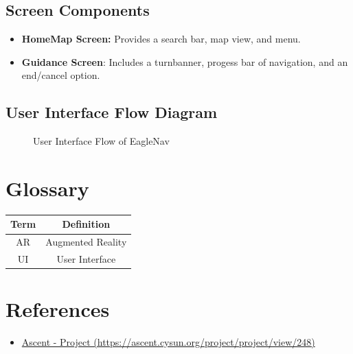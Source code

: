 \documentclass{article}
\begin{document}
\subsection{Screen Components}
\begin{itemize}
	\item \textbf{HomeMap Screen:} Provides a search bar, map view, and menu.
	\item \textbf{Guidance Screen}: Includes a turnbanner, progess bar of navigation, and an end/cancel option.
\end{itemize}

\subsection{User Interface Flow Diagram}

\begin{figure}[H]
\centering
{}
\caption{User Interface Flow of EagleNav}
\end{figure}
\FloatBarrier


\section{Glossary}
\begin{table}[h!]
	\begin{tabular}{|c|c|}
		\hline
		\textbf{Term} &\textbf{Definition}\\
		\hline
		AR & Augmented Reality \\
		UI & User Interface \\
		\hline
	\end{tabular}
\end{table}



\section{References}
\begin{itemize}
\item{\href{https://ascent.cysun.org/project/project/view/248}{Ascent - Project (https://ascent.cysun.org/project/project/view/248)}}
\end{itemize}
\end{document}
